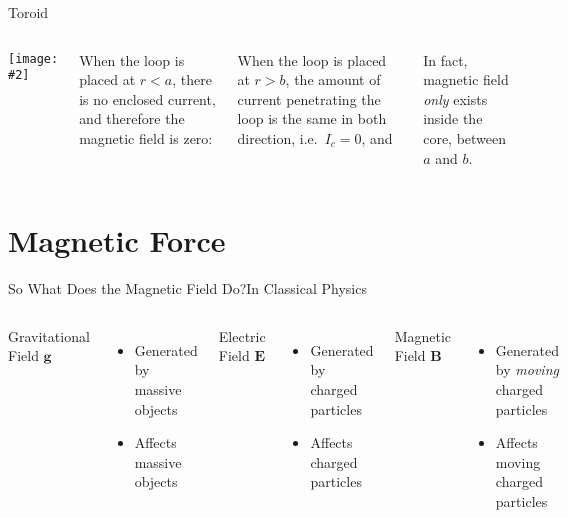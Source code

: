 \documentclass[12pt,aspectratio=169]{beamer}
\newcommand{\pic}[2]{\texttt{[image: \#2]}}
\newcommand{\eq}[2]{\vspace{#1}{\Large\begin{displaymath}#2\end{displaymath}}}
\begin{document}
\begin{frame}{Toroid}
  \begin{columns}
    \pic{1.15}{toroid}

    When the loop is placed at $r<a$, there is no enclosed
    current, and therefore the magnetic field is zero:

    \eq{-.3in}{B=0\quad\text{for}\quad r<a}

    \vspace{-.2in}When the loop is placed at $r>b$, the amount of current
    penetrating the loop is the same in both direction, i.e.\ $I_c=0$, and

    \eq{-.3in}{B=0\quad\text{for}\quad r>b}
    
    \vspace{-.1in}In fact, magnetic field \emph{only} exists inside the core,
    between $a$ and $b$.
%    
  \end{columns}
\end{frame}




\section{Magnetic Force}

\begin{frame}{So What Does the Magnetic Field Do?}{In Classical Physics}
  \begin{columns}
    \begin{center}
      Gravitational Field $\bm{g}$
    \end{center}
    \begin{itemize}
    \item Generated by massive objects
    \item Affects massive objects
    \end{itemize}

    \begin{center}
      Electric Field $\bm{E}$
    \end{center}
    \begin{itemize}
    \item Generated by charged particles
    \item Affects charged particles
    \end{itemize}

    \begin{center}
      Magnetic Field $\bm{B}$
    \end{center}
    \begin{itemize}
    \item Generated by \emph{moving} charged particles
    \item Affects moving charged particles
    \end{itemize}
  \end{columns}
\end{frame}
\end{document}
